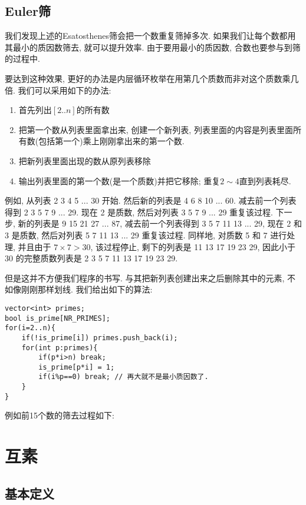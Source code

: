 \documentclass{ctexart}
\begin{document}

\subsection{Euler筛}

我们发现上述的Esatosthenes筛会把一个数重复筛掉多次. 如果我们让每个数都用其最小的质因数筛去, 就可以提升效率. 由于要用最小的质因数, 合数也要参与到筛的过程中. 

要达到这种效果, 更好的办法是内层循环枚举在用第几个质数而非对这个质数乘几倍. 我们可以采用如下的办法:
\begin{enumerate}
    \item 首先列出$[2..n]$的所有数
    \item 把第一个数从列表里面拿出来, 创建一个新列表, 列表里面的内容是列表里面所有数(包括第一个)乘上刚刚拿出来的第一个数.
    \item 把新列表里面出现的数从原列表移除
    \item 输出列表里面的第一个数(是一个质数)并把它移除; 重复$2\sim 4$直到列表耗尽.
\end{enumerate}

例如, 从列表 2 3 4 5 ... 30 开始. 然后新的列表是 4 6 8 10 ... 60. 减去前一个列表得到 2 3 5 7 9 ... 29. 现在 2 是质数, 然后对列表 3 5 7 9 ... 29 重复该过程. 下一步, 新的列表是 9 15 21 27 ... 87, 减去前一个列表得到 3 5 7 11 13 ... 29, 现在 2 和 3 是质数, 然后对列表 5 7 11 13 ... 29 重复该过程. 同样地, 对质数 5 和 7 进行处理, 并且由于 $7 \times 7 > 30$, 该过程停止, 剩下的列表是 11 13 17 19 23 29, 因此小于 30 的完整质数列表是 2 3 5 7 11 13 17 19 23 29. 

但是这并不方便我们程序的书写. 与其把新列表创建出来之后删除其中的元素, 不如像刚刚那样划线. 我们给出如下的算法:

\begin{lstlisting}
vector<int> primes; 
bool is_prime[NR_PRIMES];
for(i=2..n){
    if(!is_prime[i]) primes.push_back(i);
    for(int p:primes){
        if(p*i>n) break;
        is_prime[p*i] = 1;
        if(i%p==0) break; // 再大就不是最小质因数了.
    }
}
\end{lstlisting}


例如前15个数的筛去过程如下:


\section{互素}

\subsection{基本定义} 
\end{document}
